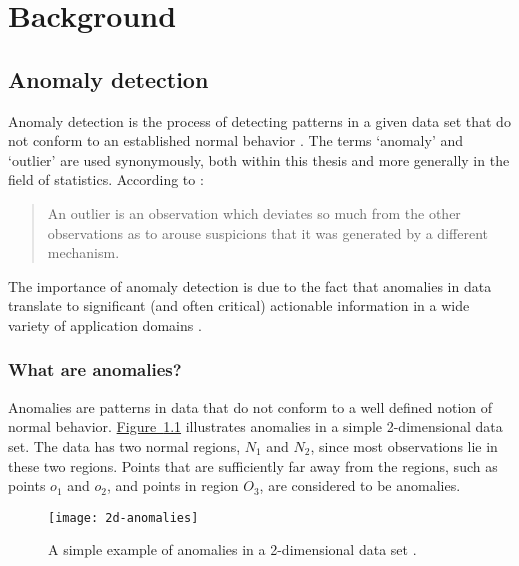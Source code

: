 \chapter{Background}
\label{ch:background}

\section{Anomaly detection}
\label{sec:anomalyDetection}
Anomaly detection is the process of detecting patterns in a given data set that 
do not conform to an established normal behavior \cite{Chandola:2007}. The terms
`anomaly' and `outlier' are used synonymously, both within this thesis and more 
generally in the field of statistics. According to \citeauthor{Hawkins:1980} 
\cite{Hawkins:1980}:

\begin{quote}
An outlier is an observation which deviates so much from the other observations 
as to arouse suspicions that it was generated by a different mechanism.
\end{quote}

The importance of anomaly detection is due to the fact that anomalies in data
translate to significant (and often critical) actionable information in a wide 
variety of application domains \cite{Chandola:2007}.

\subsection{What are anomalies?}
\label{sec:whatAreAnomalies}
Anomalies are patterns in data that do not conform to a well defined notion of
normal behavior. \hyperref[fig:2d-anomalies]{Figure~\ref{fig:2d-anomalies}} 
illustrates anomalies in a simple 2-dimensional data set. The data has two 
normal regions, $N_{1}$ and $N_{2}$, since most observations lie in these two 
regions. Points that are sufficiently far away from the regions, such as points 
$o_{1}$ and $o_{2}$, and points in region $O_{3}$, are considered to be 
anomalies.

\begin{figure}
\centering
\texttt{[image: 2d-anomalies]}
\caption[A simple example of anomalies in a 2-dimensional data set.]{A simple 
example of anomalies in a 2-dimensional data set \cite{Chandola:2007}.}
\label{fig:2d-anomalies}
\end{figure}

